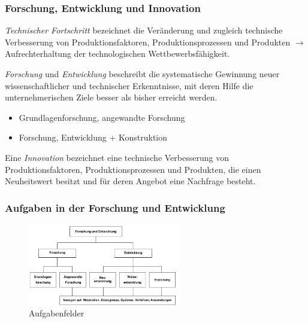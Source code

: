 \documentclass[11pt]{article}
\begin{document}
\subsubsection{Forschung, Entwicklung und Innovation}
\label{sec:orga0093c0}
\emph{Technischer Fortschritt} bezeichnet die Veränderung und zugleich technische Verbesserung von Produktionsfaktoren, Produktionsprozessen und Produkten \(\rightarrow\) Aufrechterhaltung der technologischen Wettbewerbsfähigkeit.

\emph{Forschung} und \emph{Entwicklung} beschreibt die systematische Gewinnung neuer wissenschaftlicher und technischer Erkenntnisse, mit deren Hilfe die unternehmerischen Ziele besser als bisher erreicht werden.
\begin{itemize}
\item Grundlagenforschung, angewandte Forschung
\item Forschung, Entwicklung + Konstruktion
\end{itemize}

Eine \emph{Innovation} bezeichnet eine technische Verbesserung von Produktionsfaktoren, Produktionsprozessen und Produkten, die einen Neuheitswert besitzt und für deren Angebot eine Nachfrage besteht.

\subsubsection{Aufgaben in der Forschung und Entwicklung}
\label{sec:org06be7ec}
\begin{figure}[htbp]
\centering
\includegraphics[width=250px]{./pictures/inaufg.png}
\caption{Aufgabenfelder}
\end{figure} 
\end{document}
